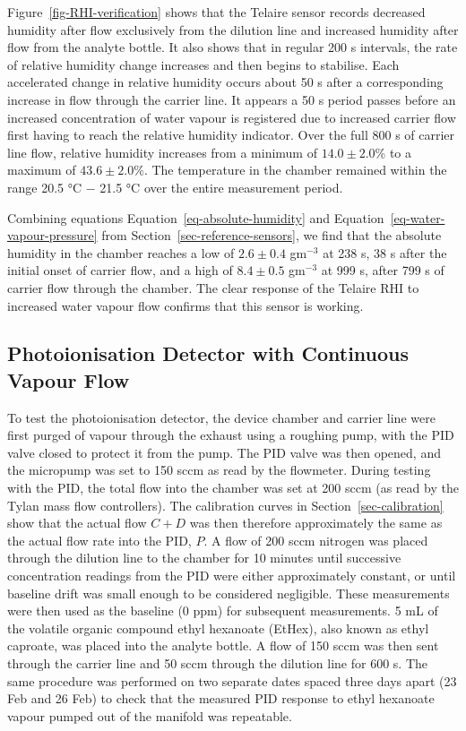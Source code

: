 \documentclass[
  a4paper,
]{scrbook}
\begin{document}
Figure~\ref{fig-RHI-verification} shows that the Telaire sensor records
decreased humidity after flow exclusively from the dilution line and
increased humidity after flow from the analyte bottle. It also shows
that in regular 200 s intervals, the rate of relative humidity change
increases and then begins to stabilise. Each accelerated change in
relative humidity occurs about 50 s after a corresponding increase in
flow through the carrier line. It appears a 50 s period passes before an
increased concentration of water vapour is registered due to increased
carrier flow first having to reach the relative humidity indicator. Over
the full 800 s of carrier line flow, relative humidity increases from a
minimum of \(14.0 \pm 2.0\)\% to a maximum of \(43.6 \pm 2.0\)\%. The
temperature in the chamber remained within the range 20.5 °C \(-\) 21.5
°C over the entire measurement period.

Combining equations Equation~\ref{eq-absolute-humidity} and
Equation~\ref{eq-water-vapour-pressure} from
Section~\ref{sec-reference-sensors}, we find that the absolute humidity
in the chamber reaches a low of \(2.6 \pm 0.4\) gm\(^{-3}\) at 238 s, 38
s after the initial onset of carrier flow, and a high of \(8.4 \pm 0.5\)
gm\(^{-3}\) at 999 s, after 799 s of carrier flow through the chamber.
The clear response of the Telaire RHI to increased water vapour flow
confirms that this sensor is working.

\hypertarget{photoionisation-detector-with-continuous-vapour-flow}{%
\subsection{Photoionisation Detector with Continuous Vapour
Flow}\label{photoionisation-detector-with-continuous-vapour-flow}}

To test the photoionisation detector, the device chamber and carrier
line were first purged of vapour through the exhaust using a roughing
pump, with the PID valve closed to protect it from the pump. The PID
valve was then opened, and the micropump was set to 150 sccm as read by
the flowmeter. During testing with the PID, the total flow into the
chamber was set at 200 sccm (as read by the Tylan mass flow
controllers). The calibration curves in Section~\ref{sec-calibration}
show that the actual flow \(C + D\) was then therefore approximately the
same as the actual flow rate into the PID, \(P\). A flow of 200 sccm
nitrogen was placed through the dilution line to the chamber for 10
minutes until successive concentration readings from the PID were either
approximately constant, or until baseline drift was small enough to be
considered negligible. These measurements were then used as the baseline
(0 ppm) for subsequent measurements. 5 mL of the volatile organic
compound ethyl hexanoate (EtHex), also known as ethyl caproate, was
placed into the analyte bottle. A flow of 150 sccm was then sent through
the carrier line and 50 sccm through the dilution line for 600 s. The
same procedure was performed on two separate dates spaced three days
apart (23 Feb and 26 Feb) to check that the measured PID response to
ethyl hexanoate vapour pumped out of the manifold was repeatable.
\end{document}
